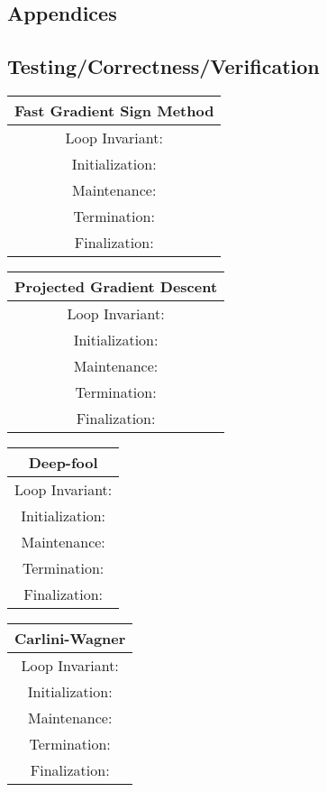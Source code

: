 \documentclass[11pt]{article}
\newcommand{\maincontent}{
\clearpage
\phantom{}
}
\begin{document}
\maincontent
\begin{center}
\section{Appendices}
\br
\subsection{Testing/Correctness/Verification}
\par{}\par
\begin{center}
\begin{tabular}{||c||} 
 \hline
 Fast Gradient Sign Method\\ [0.5ex] 
 \hline
 Loop Invariant: \\ 
 \hline
 Initialization: \\
 \hline
 Maintenance: \\
 \hline
 Termination: \\
 \hline
 Finalization: \\ [1ex] 
 \hline
\end{tabular}
\end{center}
\br
\begin{center}
\begin{tabular}{||c||} 
 \hline
 Projected Gradient Descent\\ [0.5ex] 
 \hline
 Loop Invariant: \\ 
 \hline
 Initialization: \\
 \hline
 Maintenance: \\
 \hline
 Termination: \\
 \hline
 Finalization: \\ [1ex] 
 \hline
\end{tabular}
\end{center}
\br
\begin{center}
\begin{tabular}{||c||} 
 \hline
 Deep-fool\\ [0.5ex] 
 \hline
 Loop Invariant: \\ 
 \hline
 Initialization: \\
 \hline
 Maintenance: \\
 \hline
 Termination: \\
 \hline
 Finalization: \\ [1ex] 
 \hline
\end{tabular}
\end{center}
\br
\begin{center}
\begin{tabular}{||c||} 
 \hline
 Carlini-Wagner\\ [0.5ex] 
 \hline
 Loop Invariant: \\ 
 \hline
 Initialization: \\
 \hline
 Maintenance: \\
 \hline
 Termination: \\
 \hline
 Finalization: \\ [1ex] 
 \hline
\end{tabular}
\end{center}

\end{center}
\end{document}
